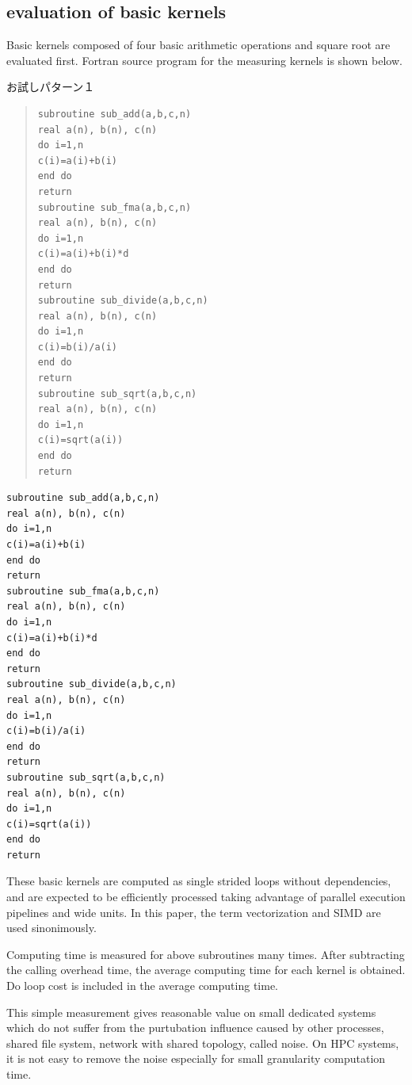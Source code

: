 \documentclass[conference]{IEEEtran}
\begin{document}
\begin{table}[b]
\end{table}


\subsection{evaluation of basic kernels}

Basic kernels composed of four basic arithmetic operations and square root
are evaluated first.
Fortran source program for the measuring kernels is shown below.

お試しパターン１
\begin{quote}
\begin{small}
\begin{verbatim}
subroutine sub_add(a,b,c,n)
real a(n), b(n), c(n)  
do i=1,n
c(i)=a(i)+b(i)
end do
return
subroutine sub_fma(a,b,c,n)
real a(n), b(n), c(n)  
do i=1,n
c(i)=a(i)+b(i)*d
end do
return
subroutine sub_divide(a,b,c,n)
real a(n), b(n), c(n)  
do i=1,n
c(i)=b(i)/a(i)
end do
return
subroutine sub_sqrt(a,b,c,n)
real a(n), b(n), c(n)  
do i=1,n
c(i)=sqrt(a(i))
end do
return
\end{verbatim}
\end{small}
\end{quote}


\begin{lstlisting}
subroutine sub_add(a,b,c,n)
real a(n), b(n), c(n)  
do i=1,n
c(i)=a(i)+b(i)
end do
return
subroutine sub_fma(a,b,c,n)
real a(n), b(n), c(n)  
do i=1,n
c(i)=a(i)+b(i)*d
end do
return
subroutine sub_divide(a,b,c,n)
real a(n), b(n), c(n)  
do i=1,n
c(i)=b(i)/a(i)
end do
return
subroutine sub_sqrt(a,b,c,n)
real a(n), b(n), c(n)  
do i=1,n
c(i)=sqrt(a(i))
end do
return
\end{lstlisting}


These basic kernels are computed as single strided loops without dependencies,
and are expected to be efficiently processed taking advantage of parallel
execution pipelines and wide units.
In this paper, the term vectorization and SIMD are used sinonimously.

Computing time is measured for above subroutines many times.
After subtracting the calling overhead time,
the average computing time for each kernel is obtained.
Do loop cost is included in the average computing time.

This simple measurement gives reasonable value on small dedicated systems
which do not suffer from the purtubation influence caused by
other processes, shared file system, network with shared topology,
called noise.
On HPC systems, it is not easy to remove the noise
especially for small granularity computation time.
\end{document}
